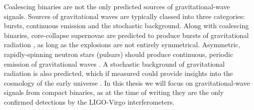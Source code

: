 \begin{colsection}
Coalescing binaries are not the only predicted sources of gravitational-wave signals. Sources of gravitational waves are typically classed into three categories: bursts, continuous emission and the stochastic background. Along with coalescing binaries, core-collapse supernovae are predicted to produce bursts of gravitational radiation \citep{GW_supernovae}, as long as the explosions are not entirely symmetrical. Asymmetric, rapidly-spinning neutron stars (pulsars) should produce continuous, periodic emission of gravitational waves \citep{GW_pulsars}. A stochastic background of gravitational radiation is also predicted, which if measured could provide insights into the cosmology of the early universe \citep{GW_background, GW_background2}. In this thesis we will focus on gravitational-wave signals from compact binaries, as at the time of writing they are the only confirmed detections by the LIGO-Virgo interferometers.

\end{colsection}


